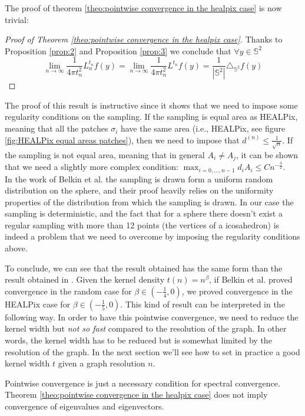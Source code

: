 The proof of theorem \ref{theo:pointwise convergence in the healpix case} is now trivial:
\begin{proof}[Proof of Theorem \ref{theo:pointwise convergence in the healpix case}]
	Thanks to Proposition \ref{prop:2} and Proposition \ref{prop:3}	we conclude that $\forall y\in\mathbb S^2 $
	$$\lim_{n\to\infty}\frac{1}{4\pi t_n^2} L_n^{t_n}f(y) =  \lim_{n\to\infty}\frac{1}{4\pi t_n^2} L^{t_n}f(y) = \frac{1}{|\mathbb S^2|}\triangle_{\mathbb S^2}f(y) $$
\end{proof}

The proof of this result is instructive since it shows that we need to impose some regularity conditions on the sampling. If the sampling is equal area as HEALPix, meaning that all the patches $\sigma_i$ have the same area (i.e., HEALPix, see figure \ref{fig:HEALPix equal areas patches}), then we need to impose that $ d^{(n)}\leq \frac{1}{\sqrt{n}}$. If the sampling is not equal area, meaning that in general $A_i\neq A_j$, it can be shown that we need a slightly more complex condition: $\max_{i=0,...,n-1}d_iA_i\leq Cn^{-\frac{3}{2}}$.\\
In the work of Belkin et al. the sampling is drawn form a uniform random distribution on the sphere, and their proof heavily relies on the uniformity properties of the distribution from which the sampling is drawn. In our case the sampling is deterministic, and the fact that for a sphere there doesn't exist a regular sampling with more than 12 points (the vertices of a icosahedron) is indeed a problem that we need to overcome by imposing the regularity conditions above. 


To conclude, we can see that the result obtained has the same form than the result obtained in \cite{Belkin:2005:TTF:2138147.2138189}. Given the kernel density $t(n)=n^\beta$, if Belkin et al. proved convergence in the random case for $\beta \in (-\frac{1}{4}, 0)$, we proved convergence in the HEALPix case for $\beta \in (-\frac{1}{5}, 0)$. This kind of result can be interpreted in the following way. In order to have this pointwise convergence, we need to reduce the kernel width but \textit{not so fast} compared to the resolution of the graph. In other words, the kernel width has to be reduced but is somewhat limited by the resolution of the graph. In the next section we'll see how to set in practice a good kernel width $t$ given a graph resolution $n$.
\begin{remark}
	Pointwise convergence is just a necessary condition for spectral convergence.  Theorem \ref{theo:pointwise convergence in the healpix case} does not imply convergence of eigenvalues and eigenvectors.
\end{remark}

